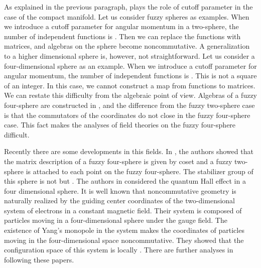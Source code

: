 \documentclass[a4paper,11pt]{article}
\begin{document}
As explained in the previous paragraph, 
\coordHE{} plays the role of cutoff parameter in the case of the compact manifold. 
Let us consider fuzzy spheres as examples. 
When we introduce a cutoff parameter \coordHE{} for angular momentum 
in a two-sphere, 
the number of independent functions is 
\coordHE{}. 
Then we can replace the functions with \coordHE{} matrices, 
and algebras on the sphere become noncommutative.  
A generalization to a higher dimensional sphere is, 
however, not straightforward. 
Let us consider a four-dimensional sphere as an example. 
When we introduce a cutoff parameter \coordHE{} for angular momentum, 
the number of independent functions is 
\coordHE{}. 
This is not a square of an integer. 
In this case, we cannot construct a map from functions to matrices. 
We can restate this difficulty from the algebraic point of view. 
Algebras of a fuzzy four-sphere are constructed in \cite{castelino}, 
and the difference from the fuzzy two-sphere case is that 
the commutators of the coordinates do not close 
in the fuzzy four-sphere case. 
This fact makes the analyses of field theories on the fuzzy 
four-sphere difficult. 

Recently there are some developments in this fields. 
In \cite{horamgooram}, the authors showed that 
the matrix description of a fuzzy four-sphere 
is given by \coordHE{} coset 
and a fuzzy two-sphere is attached to each point on 
the fuzzy four-sphere. The stabilizer group of this sphere 
is not \coordHE{} but \coordHE{}. 
The authors in \cite{zhanghu} considered the quantum Hall effect 
in a four dimensional sphere. 
It is well known that 
noncommutative geometry is naturally realized by the guiding 
center coordinates of the two-dimensional system of electrons 
in a constant magnetic field. 
Their system is composed of particles moving in a four-dimensional 
sphere under the \coordHE{} gauge field. 
The existence of Yang's \coordHE{} monopole\cite{Yang} 
in the system makes the coordinates of particles 
moving in the four-dimensional space noncommutative. 
They showed that the configuration space of this system is 
locally \coordHE{}. 
There are further analyses in \cite{fabinger,chenhou,karanair} 
following these papers. 
\end{document}
